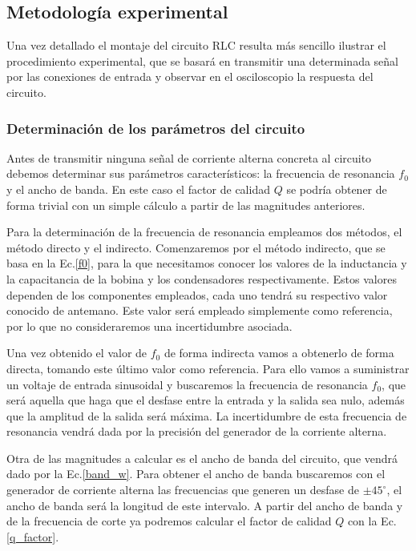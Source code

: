 \documentclass[a4paper,12pt,titlepage]{article}
\begin{document}
\subsection{Metodología experimental}

Una vez detallado el montaje del circuito RLC resulta más sencillo ilustrar el procedimiento experimental, que se basará en transmitir una determinada señal por las conexiones de entrada y observar en el osciloscopio la respuesta del circuito.

\subsubsection{Determinación de los parámetros del circuito}

Antes de transmitir ninguna señal de corriente alterna concreta al circuito debemos determinar sus parámetros característicos: la frecuencia de resonancia $f_0$ y el ancho de banda. En este caso el factor de calidad $Q$ se podría obtener de forma trivial con un simple cálculo a partir de las magnitudes anteriores.

Para la determinación de la frecuencia de resonancia empleamos dos métodos, el método directo y el indirecto. Comenzaremos por el método indirecto, que se basa en la Ec.\ref{f0}, para la que necesitamos conocer los valores de la inductancia y la capacitancia de la bobina y los condensadores respectivamente. Estos valores dependen de los componentes empleados, cada uno tendrá su respectivo valor conocido de antemano. Este valor será empleado simplemente como referencia, por lo que no consideraremos una incertidumbre asociada.

Una vez obtenido el valor de $f_0$ de forma indirecta vamos a obtenerlo de forma directa, tomando este último valor como referencia. Para ello vamos a suministrar un voltaje de entrada sinusoidal y buscaremos la frecuencia de resonancia $f_0$, que será aquella que haga que el desfase entre la entrada y la salida sea nulo, además que la amplitud de la salida será máxima. La incertidumbre de esta frecuencia de resonancia vendrá dada por la precisión del generador de la corriente alterna.

Otra de las magnitudes a calcular es el ancho de banda del circuito, que vendrá dado por la Ec.\ref{band_w}. Para obtener el ancho de banda buscaremos con el generador de corriente alterna las frecuencias que generen un desfase de $\pm 45^{\circ}$, el ancho de banda será la longitud de este intervalo. A partir del ancho de banda y de la frecuencia de corte ya podremos calcular el factor de calidad $Q$ con la Ec.\ref{q_factor}.
\end{document}
